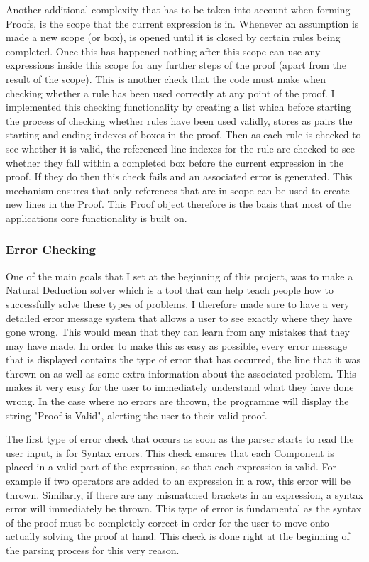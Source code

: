 Another additional complexity that has to be taken into account when forming Proofs, is the scope that the current expression is in. Whenever an assumption is made a new scope (or box), is opened until it is closed by certain rules being completed. Once this has happened nothing after this scope can use any expressions inside this scope for any further steps of the proof (apart from the result of the scope). This is another check that the code must make when checking whether a rule has been used correctly at any point of the proof. I implemented this checking functionality by creating a list which before starting the process of checking whether rules have been used validly, stores as pairs the starting and ending indexes of boxes in the proof. Then as each rule is checked to see whether it is valid, the referenced line indexes for the rule are checked to see whether they fall within a completed box before the current expression in the proof. If they do then this check fails and an associated error is generated. This mechanism ensures that only references that are in-scope can be used to create new lines in the Proof. This Proof object therefore is the basis that most of the applications core functionality is built on.

\subsubsection{Error Checking}

One of the main goals that I set at the beginning of this project, was to make a Natural Deduction solver which is a tool that can help teach people how to successfully solve these types of problems. I therefore made sure to have a very detailed error message system that allows a user to see exactly where they have gone wrong. This would mean that they can learn from any mistakes that they may have made. In order to make this as easy as possible, every error message that is displayed contains the type of error that has occurred, the line that it was thrown on as well as some extra information about the associated problem. This makes it very easy for the user to immediately understand what they have done wrong. In the case where no errors are thrown, the programme will display the string "Proof is Valid", alerting the user to their valid proof. 

The first type of error check that occurs as soon as the parser starts to read the user input, is for Syntax errors. This check ensures that each Component is placed in a valid part of the expression, so that each expression is valid. For example if two operators are added to an expression in a row, this error will be thrown. Similarly, if there are any mismatched brackets in an expression, a syntax error will immediately be thrown. This type of error is fundamental as the syntax of the proof must be completely correct in order for the user to move onto actually solving the proof at hand. This check is done right at the beginning of the parsing process for this very reason.

